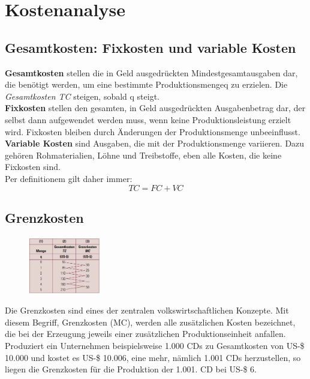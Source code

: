 \documentclass[10pt]{scrartcl}
\begin{document}
\section{Kostenanalyse}
\subsection{Gesamtkosten: Fixkosten und variable Kosten}
{\bf Gesamtkosten } stellen die in Geld ausgedrückten Mindestgesamtausgaben dar, die benötigt werden, um eine bestimmte Produktionsmengeq zu erzielen. Die {\it Gesamtkosten TC}  steigen, sobald q steigt. \\
{\bf Fixkosten } stellen den gesamten, in Geld ausgedrückten Ausgabenbetrag dar, der selbst dann aufgewendet werden muss, wenn keine Produktionsleistung erzielt wird. Fixkosten bleiben durch Änderungen der Produktionsmenge unbeeinflusst.\\
{\bf Variable Kosten } sind Ausgaben, die mit der Produktionsmenge variieren. Dazu gehören Rohmaterialien, Löhne und Treibstoffe, eben alle Kosten, die keine Fixkosten sind. \\
Per definitionem gilt daher immer:
\begin{equation}
TC = FC + VC \nonumber
\end{equation}
\subsection{Grenzkosten}
\begin{figure}
\vspace{-20pt}
  \begin{center}
    \includegraphics[width=0.28\textwidth]{img/grenzkosten_einfach.jpg}
  \end{center}
  \vspace{-20pt}
\end{figure}
Die Grenzkosten sind eines der zentralen volkswirtschaftlichen Konzepte. Mit diesem Begriff, Grenzkosten (MC), werden alle zusätzlichen Kosten bezeichnet, die bei der Erzeugung jeweils einer zusätzlichen Produktionseinheit anfallen. Produziert ein Unternehmen beispielsweise 1.000 CDs zu Gesamtkosten von US-\$ 10.000 und kostet es US-\$ 10.006, eine mehr, nämlich 1.001 CDs herzustellen, so liegen die Grenzkosten für die Produktion der 1.001. CD bei US-\$ 6.\\ \\
\end{document}
